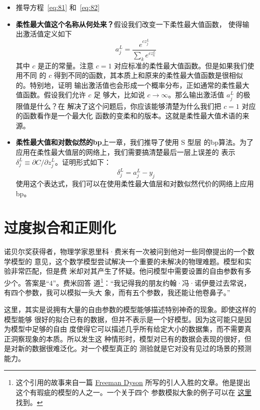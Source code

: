 \begin{itemize}
\item 推导方程~\eqref{eq:81} 和~\eqref{eq:82}
\item \textbf{柔性最大值这个名称从何处来？}\quad 假设我们改变一下柔性最大值函数，
  使得输出激活值定义如下
  \begin{equation}
    a^L_j = \frac{e^{c z^L_j}}{\sum_k e^{c z^L_k}}
    \label{eq:83}\tag{83}
  \end{equation}
  其中 $c$ 是正的常量。注意 $c=1$ 对应标准的柔性最大值函数。但是如果我们使用不同
  的 $c$ 得到不同的函数，其本质上和原来的柔性最大值函数是很相似的。特别地，证明
  输出激活值也会形成一个概率分布，正如通常的柔性最大值函数。假设我们允许 $c$ 足
  够大，比如说 $c\rightarrow \infty$。那么输出激活值 $a_j^L$ 的极限值是什么？在
  解决了这个问题后，你应该能够清楚为什么我们把 $c=1$ 对应的函数看作是一个最大化
  函数的变柔和的版本。这就是柔性最大值术语的来源。
\item \textbf{柔性最大值和对数似然的\gls*{bp}}\quad 上一章，我们推导了使用 S 型层
  的\gls*{bp}算法。为了应用在柔性最大值层的网络上，我们需要搞清楚最后一层上误差的
  表示 $\delta^L_j \equiv \partial C / \partial z^L_j$。证明形式如下：
  \begin{equation}
    \delta^L_j = a^L_j -y_j
    \label{eq:84}\tag{84}
  \end{equation}
  使用这个表达式，我们可以在使用柔性最大值层和对数似然代价的网络上应用\gls*{bp}。
\end{itemize}

\section{过度拟合和正则化}
\label{sec:overfitting_and_regularization}

诺贝尔奖获得者，物理学家恩里科·费米有一次被问到他对一些同僚提出的一个数学模型的
意见，这个数学模型尝试解决一个重要的未解决的物理难题。模型和实验非常匹配，但是费
米却对其产生了怀疑。他问模型中需要设置的自由参数有多少个。答案是“4”。费米回答
道\footnote{这个引用的故事来自一篇
  \href{http://www.nature.com/nature/journal/v427/n6972/full/427297a.html}{Freeman
    Dyson} 所写的引人入胜的文章。他是提出这个有瑕疵的模型的人之一。一个关于四个
  参数模拟大象的例子可以在%
  \href{http://www.johndcook.com/blog/2011/06/21/how-to-fit-an-elephant/}{这里}%
  找到。}：“我记得我的朋友约翰·冯·诺伊曼过去常说，有四个参数，我可以模拟一头大
象，而有五个参数，我还能让他卷鼻子。”

这里，其实是说拥有大量的自由参数的模型能够描述特别神奇的现象。即使这样的模型能够
很好的拟合已有的数据，但并不表示是一个好模型。因为这可能只是因为模型中足够的自由
度使得它可以描述几乎所有给定大小的数据集，而不需要真正洞察现象的本质。所以发生这
种情形时，模型对已有的数据会表现的很好，但是对新的数据很难泛化。对一个模型真正的
测验就是它对没有见过的场景的预测能力。

